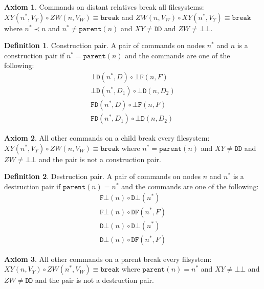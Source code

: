 \documentclass[12pt]{article}
\newcommand{\empt}{\bot}
\newcommand{\parent}{\mathtt{parent}}
\newcommand{\nn}{n^*} %
\newcommand{\cbrk}{\mathtt{break}} %
\newcommand{\fscommand}[2]{{#1#2}}
\newcommand{\fsregcommandchar}[1]{\mathtt{#1}}
\newcommand{\fsregcommand}[2]{\fscommand{\fsregcommandchar{#1}}{\fsregcommandchar{#2}}}
\newcommand{\cbb}{\fsregcommand{\empt}{\empt}}
\newcommand{\cbf}{\fsregcommand{\empt}{F}}
\newcommand{\cbd}{\fsregcommand{\empt}{D}}
\newcommand{\cfb}{\fsregcommand{F}{\empt}}
\newcommand{\cfd}{\fsregcommand{F}{D}}
\newcommand{\cdb}{\fsregcommand{D}{\empt}}
\newcommand{\cdf}{\fsregcommand{D}{F}}
\newcommand{\cdd}{\fsregcommand{D}{D}}
\newcommand{\cxy}{\fscommand{X}{Y}}
\newcommand{\czw}{\fscommand{Z}{W}}
\newcommand{\cc}{\circ} %
\newcommand{\descendant}{\prec}
\theoremstyle{definition}
\newtheorem{mydef}{Definition}
\newtheorem{myax}{Axiom}
\begin{document}
\begin{myax}\label{ax_distantrel_breaks}
Commands on distant relatives break all filesystems:
$\cxy(\nn,V_Y)\cc  \czw(n,V_W) \equiv \cbrk$
and $\czw(n,V_W)\cc \cxy(\nn,V_Y) \equiv\cbrk$
where $\nn\descendant n$ and $\nn\neq\parent(n)$ and $\cxy\neq\cdd$ and $\czw\neq\cbb$.
\end{myax}

\begin{mydef}{Construction pair.}
A pair of commands on nodes $\nn$ and $n$ is a construction pair if $\nn=\parent(n)$ 
and the commands are one
of the following:
   \begin{gather*}
            \cbd(\nn, D)\cc  \cbf(n, F) \\
            \cbd(\nn, D_1)\cc  \cbd(n, D_2) \\
            \cfd(\nn, D)\cc  \cbf(n, F) \\
            \cfd(\nn, D_1)\cc  \cbd(n, D_2)
   \end{gather*}
\end{mydef}

\begin{myax}\label{ax_directchild_breaks}
All other commands on a child break every filesystem:
$\cxy(\nn,V_Y)\cc  \czw(n,V_W) \equiv \cbrk$ where $\nn=\parent(n)$ and $\cxy\neq\cdd$ and $\czw\neq\cbb$
and the pair is not a construction pair.
\end{myax}

\begin{mydef}{Destruction pair.}
A pair of commands on nodes $n$ and $\nn$ is a destruction pair if $\parent(n)=\nn$ and the commands are one
of the following:
   \begin{gather*}
            \cfb(n)\cc  \cdb(\nn) \\
            \cfb(n)\cc  \cdf(\nn, F) \\
            \cdb(n)\cc  \cdb(\nn) \\
            \cdb(n)\cc  \cdf(\nn, F)
   \end{gather*}
\end{mydef}

\begin{myax}\label{ax_directparent_breaks}
All other commands on a parent break every filsystem:
$\cxy(n,V_Y)\cc  \czw(\nn,V_W) \equiv \cbrk$ where $\parent(n)=\nn$ and $\cxy\neq\cbb$ and $\czw\neq\cdd$
and the pair is not a destruction pair.
\end{myax}
\end{document}
